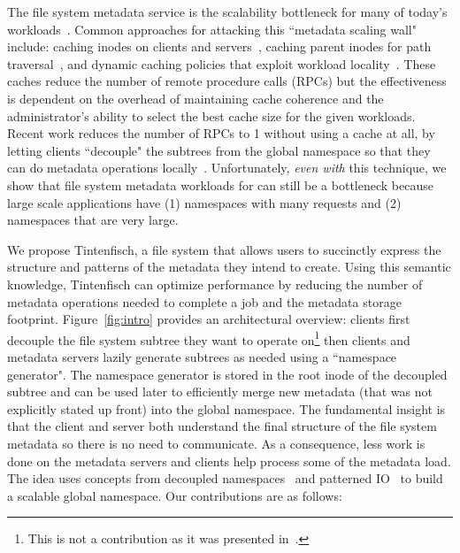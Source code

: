 The file system metadata service is the scalability bottleneck for many of
today's workloads~\cite{roselli:atec2000-FS-workloads,
abad:techreport2012-fstrace, abad:ucc2012-mimesis,
alam:pdsw2011-metadata-scaling, weil:osdi2006-ceph}.  Common approaches for
attacking this ``metadata scaling wall" include: caching inodes on clients and
servers~\cite{depardon:tech13-survey, sinnamohideen:atc2010-ursa,
hildebrand:msst2005-pnfs, devulapalli:ipdps07-pvfs2, welch:fast2008-panasas},
caching parent inodes for path traversal~\cite{patil:fast2011-giga+,
ren:sc2014-indexfs, brandt:msst2003-lh, weil:sc2004-dyn-metadata,
ren:sc2014-indexfs}, and dynamic caching policies that exploit workload
locality~\cite{xing:sc2009-skyfs, zhu:pds2008-hba, li:msst2006-dynamic}.  These
caches reduce the number of remote procedure calls (RPCs) but the effectiveness
is dependent on the overhead of maintaining cache coherence and the
administrator's ability to select the best cache size for the given workloads.
Recent work reduces the number of RPCs to 1 without using a cache at all, by
letting clients ``decouple" the subtrees from the global namespace so that they
can do metadata operations locally~\cite{zheng:pdsw2015-deltafs,
sevilla:ipdps18-cudele}. Unfortunately, {\it even with} this technique, we show
that file system metadata workloads for can still be a bottleneck because large
scale applications have (1) namespaces with many requests and (2) namespaces
that are very large.

We propose Tintenfisch, a file system that allows users to succinctly express
the structure and patterns of the metadata they intend to create.  Using this
semantic knowledge, Tintenfisch can optimize performance by reducing the number
of metadata operations needed to complete a job and the metadata storage
footprint. Figure~\ref{fig:intro}
provides an architectural overview: clients first decouple the file system
subtree they want to operate on\footnote{This is not a contribution as it was
presented in~\cite{sevilla:ipdps18-cudele}.} then clients and metadata servers
lazily generate subtrees as needed using a ``namespace generator". The
namespace generator is stored in the root inode of the decoupled subtree and
can be used later to efficiently merge new metadata (that was not explicitly
stated up front) into the global namespace. %
The fundamental insight is that the client and server both understand the final
structure of the file system metadata so there is no need to communicate.  As a
consequence, less work is done on the metadata servers and clients help process
some of the metadata load.  The idea uses concepts from decoupled
namespaces~\cite{zheng:pdsw2014-batchfs, zheng:pdsw2015-deltafs} and patterned
IO~\cite{he:hpdc13-plfs-patterns} to build a scalable global namespace. 
Our contributions are as follows:

